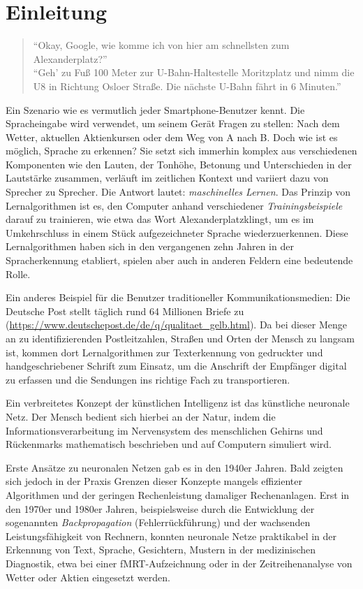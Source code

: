 \section{Einleitung}
\begin{quote}
\enquote{Okay, Google, wie komme ich von hier am schnellsten zum Alexanderplatz?}\\

\enquote{Geh' zu Fuß 100 Meter zur U-Bahn-Haltestelle Moritzplatz und nimm die U8 in Richtung Osloer Straße. Die nächste U-Bahn fährt in 6 Minuten.}
\end{quote}

Ein Szenario wie es vermutlich jeder Smartphone-Benutzer kennt. Die Spracheingabe wird verwendet, um seinem Gerät Fragen zu stellen: Nach dem Wetter, aktuellen Aktienkursen oder dem Weg von A nach B. Doch wie ist es möglich, Sprache zu erkennen? Sie setzt sich immerhin komplex aus verschiedenen Komponenten wie den Lauten, der Tonhöhe, Betonung und Unterschieden in der Lautstärke zusammen, verläuft im zeitlichen Kontext und variiert dazu von Sprecher zu Sprecher. Die Antwort lautet: \emph{maschinelles Lernen}. Das Prinzip von Lernalgorithmen ist es, den Computer anhand verschiedener \emph{Trainingsbeispiele} darauf zu trainieren, wie etwa das Wort \glqq Alexanderplatz\grqq klingt, um es im Umkehrschluss in einem Stück aufgezeichneter Sprache wiederzuerkennen. Diese Lernalgorithmen haben sich in den vergangenen zehn Jahren in der Spracherkennung etabliert, spielen aber auch in anderen Feldern eine bedeutende Rolle.

Ein anderes Beispiel für die Benutzer traditioneller Kommunikationsmedien: Die Deutsche Post stellt täglich rund 64 Millionen Briefe zu (\url{https://www.deutschepost.de/de/q/qualitaet_gelb.html}). Da bei dieser Menge an zu identifizierenden Postleitzahlen, Straßen und Orten der Mensch zu langsam ist, kommen dort Lernalgorithmen zur Texterkennung von gedruckter und handgeschriebener Schrift zum Einsatz, um die Anschrift der Empfänger digital zu erfassen und die Sendungen ins richtige Fach zu transportieren.

Ein verbreitetes Konzept der künstlichen Intelligenz ist das künstliche neuronale Netz. Der Mensch bedient sich hierbei an der Natur, indem die Informationsverarbeitung im Nervensystem des menschlichen Gehirns und Rückenmarks mathematisch beschrieben und auf Computern simuliert wird.

Erste Ansätze zu neuronalen Netzen gab es in den 1940er Jahren. Bald zeigten sich jedoch in der Praxis Grenzen dieser Konzepte mangels effizienter Algorithmen und der geringen Rechenleistung damaliger Rechenanlagen. Erst in den 1970er und 1980er Jahren, beispielsweise durch die Entwicklung der sogenannten \emph{Backpropagation} (Fehlerrückführung) und der wachsenden Leistungsfähigkeit von Rechnern, konnten neuronale Netze praktikabel in der Erkennung von Text, Sprache, Gesichtern, Mustern in der medizinischen Diagnostik, etwa bei einer fMRT-Aufzeichnung oder in der Zeitreihenanalyse von Wetter oder Aktien eingesetzt werden.

